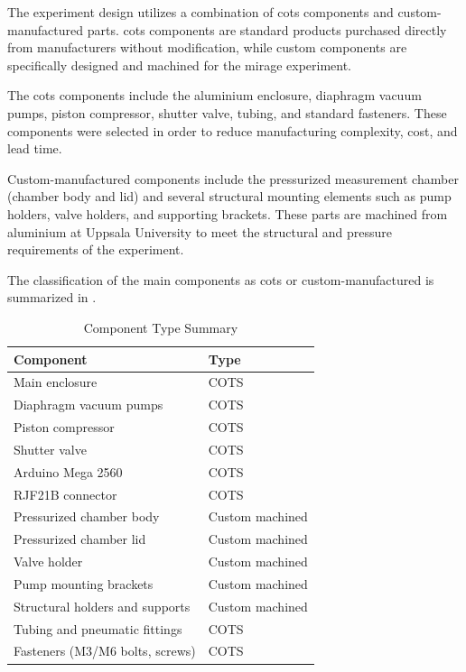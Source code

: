 The experiment design utilizes a combination of \gls{cots} components and custom-manufactured parts. \gls{cots} components are standard products purchased directly from manufacturers without modification, while custom components are specifically designed and machined for the \gls{mirage} experiment.

The \gls{cots} components include the aluminium enclosure, diaphragm vacuum pumps, piston compressor, shutter valve, tubing, and standard fasteners. These components were selected in order to reduce manufacturing complexity, cost, and lead time.

Custom-manufactured components include the pressurized measurement chamber (chamber body and lid) and several structural mounting elements such as pump holders, valve holders, and supporting brackets. These parts are machined from aluminium at Uppsala University to meet the structural and pressure requirements of the experiment.

The classification of the main components as \gls{cots} or custom-manufactured is summarized in .

\begin{table}[htbp]
\centering
\begin{tabular}{ll}
\toprule
\textbf{Component} & \textbf{Type} \\
\midrule

Main enclosure & COTS \\
Diaphragm vacuum pumps & COTS \\
Piston compressor & COTS \\
Shutter valve & COTS \\
Arduino Mega 2560 & COTS \\
RJF21B connector & COTS \\

Pressurized chamber body & Custom machined \\
Pressurized chamber lid & Custom machined \\
Valve holder & Custom machined \\
Pump mounting brackets & Custom machined \\
Structural holders and supports & Custom machined \\

Tubing and pneumatic fittings & COTS \\
Fasteners (M3/M6 bolts, screws) & COTS \\

\bottomrule
\end{tabular}
\caption{Component Type Summary}
\label{tab:component_type_summary}
\end{table}

